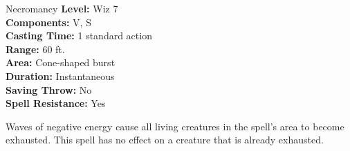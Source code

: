 {Necromancy}
{
	\textbf{Level:}
	Wiz 7\\
	\textbf{Components:}
	V, S\\
	\textbf{Casting Time:}
	1 standard action\\
	\textbf{Range:}
	60 ft.\\
	\textbf{Area:}
	Cone-shaped burst\\
	\textbf{Duration:}
	Instantaneous\\
	\textbf{Saving Throw:}
	No\\
	\textbf{Spell Resistance:}
	Yes\\
}
{
	Waves of negative energy cause all living creatures in the spell's area to become exhausted. This spell has no effect on a creature that is already exhausted.

}
